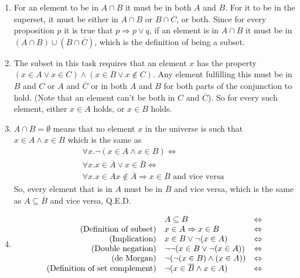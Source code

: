 \documentclass{article}
\begin{document}
\begin{enumerate}
\begin{enumerate}
            \item For an element to be in $A \cap B$ it must be in both $A$ and $B$. For it to be in the superset, it must be either in $A\cap B$ or $B \cap \overline{C}$, or both. Since for every proposition $p$ it is true that $p \Rightarrow p \lor q$, if an element is in $A \cap B$ it must be in $(A \cap B) \cup (B \cap \overline{C})$, which is the definition of being a subset.
            \item The subset in this task requires that an element $x$ has the property $(x \in A \lor x \in C) \land (x \in B \lor x \not\in C)$. Any element fulfilling this must be in $B$ and $C$ or $A$ and $\overline{C}$ or in both $A$ and $B$ for both parts of the conjunction to hold. (Note that an element can't be both in $C$ and $\overline{C}$). So for every such element, either $x \in A$ holds, or $x \in B$ holds.
            \item $A \cap B = \emptyset$ means that no element $x$ in the universe is such that $x \in A \land x \in B$ which is the same as
                \begin{align*}
                    \forall x . \lnot (x \in A \land x \in B) \Leftrightarrow \\
                \forall x . x \in \overline{A} \lor x \in \overline{B} \Leftrightarrow \\
                \forall x . x \in A x \not\in \overline{A} \Rightarrow x \in \overline{B} \text{ and vice versa }
                \end{align*}
                So, every element that is in $A$ must be in $\overline{B}$ and vice versa, which is the same as $A \subseteq \overline{B}$ and vice versa, Q.E.D.
            \item
                $$\begin{array}{r l l}
                    &A \subseteq B &\Leftrightarrow \\
                    \text{(Definition of subset)} &x \in A \Rightarrow x \in B &\Leftrightarrow\\
                    \text{(Implication)} &x \in B \lor \lnot(x \in A) &\Leftrightarrow \\
                    \text{(Double negation)} &\lnot\lnot(x \in B \lor \lnot(x \in A)) &\Leftrightarrow \\
                    \text{(de Morgan)} &\lnot(\lnot(x \in B) \land (x \in A)) & \Leftrightarrow \\
                    \text{(Definition of set complement)} &\lnot(x \in \overline{B} \land x \in A) & \Leftrightarrow \\

\end{array}$$
\end{enumerate}
\end{enumerate}
\end{document}
